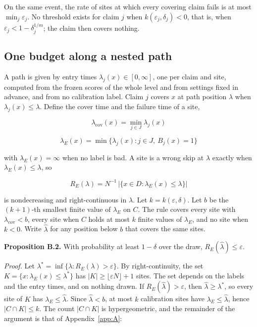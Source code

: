 \documentclass{iopjournal}
\begin{document}
On the same event, the rate of sites at which every covering claim fails is at most \(\min_j \varepsilon_j\). No threshold exists for claim \(j\) when \(k(\varepsilon_j, \delta_j) < 0\), that is, when \(\varepsilon_j < 1 - \delta_j^{1/m}\); the claim then covers nothing.

\hypertarget{one-budget-along-a-nested-path}{%
\subsection{One budget along a nested path}\label{one-budget-along-a-nested-path}}

A path is given by entry times \(\lambda_j(x) \in [0, \infty]\), one per claim and site, computed from the frozen scores of the whole level and from settings fixed in advance, and from no calibration label. Claim \(j\) covers \(x\) at path position \(\lambda\) when \(\lambda_j(x) \le \lambda\). Define the cover time and the failure time of a site,

\[
\lambda_{\mathrm{cov}}(x) = \min_{j \in J} \lambda_j(x)
\]

\[
\lambda_E(x) = \min \{\lambda_j(x) : j \in J,\ B_j(x) = 1\}
\]

with \(\lambda_E(x) = \infty\) when no label is bad. A site is a wrong skip at \(\lambda\) exactly when \(\lambda_E(x) \le \lambda\), so

\[
R_E(\lambda) = N^{-1} \, \lvert \{x \in D : \lambda_E(x) \le \lambda\} \rvert
\]

is nondecreasing and right-continuous in \(\lambda\). Let \(k = k(\varepsilon, \delta)\). Let \(b\) be the \((k+1)\)-th smallest finite value of \(\lambda_E\) on \(C\). The rule covers every site with \(\lambda_{\mathrm{cov}} < b\), every site when \(C\) holds at most \(k\) finite values of \(\lambda_E\), and no site when \(k < 0\). Write \(\hat\lambda\) for any position below \(b\) that covers the same sites.

\textbf{Proposition B.2.} With probability at least \(1 - \delta\) over the draw, \(R_E(\hat\lambda) \le \varepsilon\).

\emph{Proof.} Let \(\lambda^\ast = \inf\{\lambda : R_E(\lambda) > \varepsilon\}\). By right-continuity, the set \(K = \{x : \lambda_E(x) \le \lambda^\ast\}\) has \(|K| \ge \lfloor \varepsilon N \rfloor + 1\) sites. The set depends on the labels and the entry times, and on nothing drawn. If \(R_E(\hat\lambda) > \varepsilon\), then \(\hat\lambda \ge \lambda^\ast\), so every site of \(K\) has \(\lambda_E \le \hat\lambda\). Since \(\hat\lambda < b\), at most \(k\) calibration sites have \(\lambda_E \le \hat\lambda\), hence \(|C \cap K| \le k\). The count \(|C \cap K|\) is hypergeometric, and the remainder of the argument is that of Appendix~\ref{app:A}:
\end{document}
